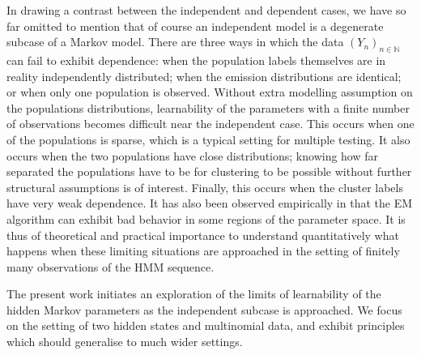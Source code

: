 \documentclass[journal]{IEEEtran}
\newcommand{\1}{\boldsymbol{1}}
\newcommand{\NN}{\mathbb{N}}
\begin{document}
	In drawing a contrast between the independent and dependent cases, we have so far omitted to mention that of course an independent model is a degenerate subcase of a Markov model. There are three ways in which the data $(Y_n)_{n\in\NN}$ can fail to exhibit dependence: when the population labels themselves are in reality independently distributed; when the emission distributions are identical; or when only one population is observed. 
	Without extra modelling assumption on the populations distributions, learnability of the parameters with a finite number of observations becomes  difficult near the independent case. This occurs when one of the populations is sparse, which is a typical setting for multiple testing.  It  also occurs  when the two populations have close distributions; knowing how far separated the populations have to be for clustering to be possible without further structural assumptions is of interest. Finally, this occurs  when the cluster labels have very weak dependence.
It has also been observed empirically in \cite{Phys:2020} that the EM algorithm can exhibit bad behavior in some regions of the parameter space. 
 It is thus of theoretical and practical importance to understand quantitatively what happens when these limiting situations are approached in the setting of finitely many observations of the HMM sequence.

	The present work initiates an exploration of the limits of learnability of the hidden Markov parameters as the independent subcase is approached. We focus on the setting of two hidden states and multinomial data, and exhibit principles which should generalise to much wider settings.
\end{document}
